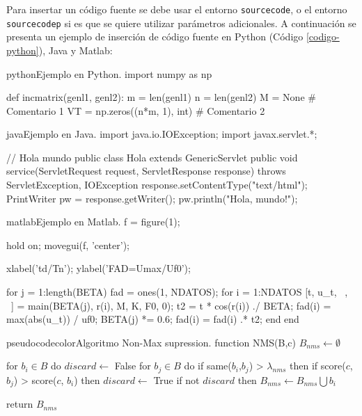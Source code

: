 	Para insertar un código fuente se debe usar el entorno \texttt{sourcecode}, o el entorno \texttt{sourcecodep} si es que se quiere utilizar parámetros adicionales. A continuación se presenta un ejemplo de inserción de código fuente en Python (Código \ref{codigo-python}), Java y Matlab:

\begin{sourcecode}[\label{codigo-python}]{python}{Ejemplo en Python.}
import numpy as np

def incmatrix(genl1, genl2):
	m = len(genl1)
	n = len(genl2)
	M = None # Comentario 1
	VT = np.zeros((n*m, 1), int) # Comentario 2
\end{sourcecode}

\begin{sourcecode}[]{java}{Ejemplo en Java.}
import java.io.IOException;
import javax.servlet.*;

// Hola mundo
public class Hola extends GenericServlet {
	public void service(ServletRequest request, ServletResponse response)
	throws ServletException, IOException{
		response.setContentType("text/html");
		PrintWriter pw = response.getWriter();
		pw.println("Hola, mundo!");
	}
}
\end{sourcecode}

\begin{sourcecode}{matlab}{Ejemplo en Matlab.}
f = figure(1);

hold on;
movegui(f, 'center');

xlabel('td/Tn');
ylabel('FAD=Umax/Uf0');

for j = 1:length(BETA)
	fad = ones(1, NDATOS); %
	for i = 1:NDATOS
		[t, u_t, ~, ~] = main(BETA(j), r(i), M, K, F0, 0);
		t2 = t * cos(r(i)) ./ BETA;
		fad(i) = max(abs(u_t)) / uf0;
		BETA(j) *= 0.6;
		fad(i) = fad(i) .* t2;
	end
end
\end{sourcecode}

\begin{sourcecode}{pseudocodecolor}{Algoritmo Non-Max supression.}
function NMS(B,c)
	$B_{nms} \leftarrow \emptyset$
	
	for $b_i \in B$ do
		$discard \leftarrow$ False
		for $b_j \in B$ do
			if same($b_i$,$b_j$) > $\lambda_{nms}$ then
				if score($c$,$b_j$) > score($c$, $b_i$) then
					$discard \leftarrow$ True
		if not $discard$ then
			$B_{nms} \leftarrow B_{nms} \bigcup b_i$
	
	return $B_{nms}$
\end{sourcecode}

